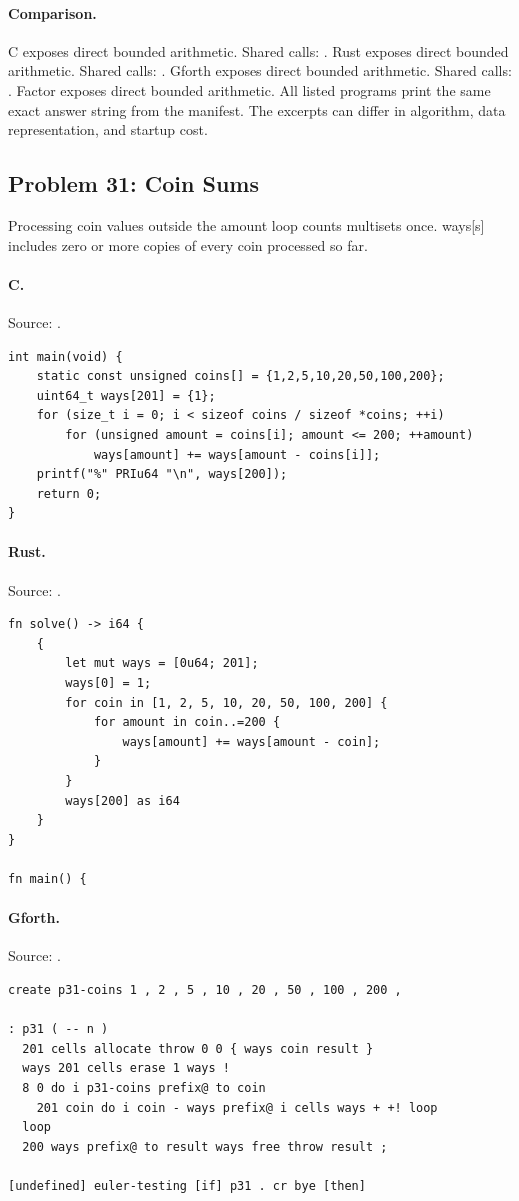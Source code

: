 \paragraph{Comparison.}
C exposes direct bounded arithmetic. Shared calls: \texttt{}. Rust exposes direct bounded arithmetic. Shared calls: \texttt{}. Gforth exposes direct bounded arithmetic. Shared calls: \texttt{}. Factor exposes direct bounded arithmetic.
All listed programs print the same exact answer string from the manifest. The excerpts can differ in algorithm, data representation, and startup cost.

\subsection{Problem 31: Coin Sums}
\label{walkthrough:p31}
Processing coin values outside the amount loop counts multisets once. ways[s] includes zero or more copies of every coin processed so far.

\paragraph{C.} Source: .
\begin{lstlisting}
int main(void) {
    static const unsigned coins[] = {1,2,5,10,20,50,100,200};
    uint64_t ways[201] = {1};
    for (size_t i = 0; i < sizeof coins / sizeof *coins; ++i)
        for (unsigned amount = coins[i]; amount <= 200; ++amount)
            ways[amount] += ways[amount - coins[i]];
    printf("%" PRIu64 "\n", ways[200]);
    return 0;
}
\end{lstlisting}

\paragraph{Rust.} Source: .
\begin{lstlisting}
fn solve() -> i64 {
    {
        let mut ways = [0u64; 201];
        ways[0] = 1;
        for coin in [1, 2, 5, 10, 20, 50, 100, 200] {
            for amount in coin..=200 {
                ways[amount] += ways[amount - coin];
            }
        }
        ways[200] as i64
    }
}

fn main() {
\end{lstlisting}

\paragraph{Gforth.} Source: .
\begin{lstlisting}
create p31-coins 1 , 2 , 5 , 10 , 20 , 50 , 100 , 200 ,

: p31 ( -- n )
  201 cells allocate throw 0 0 { ways coin result }
  ways 201 cells erase 1 ways !
  8 0 do i p31-coins prefix@ to coin
    201 coin do i coin - ways prefix@ i cells ways + +! loop
  loop
  200 ways prefix@ to result ways free throw result ;

[undefined] euler-testing [if] p31 . cr bye [then]
\end{lstlisting}

